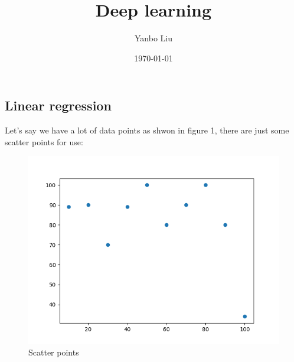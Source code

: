 \documentclass[a4paper,12pt]{article}
\begin{document}
\title{Deep learning}
\author{Yanbo Liu}
\date{\today}
\maketitle
\begin{spacing}{2}
\tableofcontents
{}
\end{spacing}
\begin{spacing}{2}
\section{Linear regression}
Let's say we have a lot of data points as shwon in figure 1, there are just some scatter points for use:
\begin{figure}[h]
\centering
\includegraphics[scale=0.5]{Figure_1.png}
\caption{Scatter points}
\label{scatter points}
\end{figure}


\end{spacing}
\end{document}
